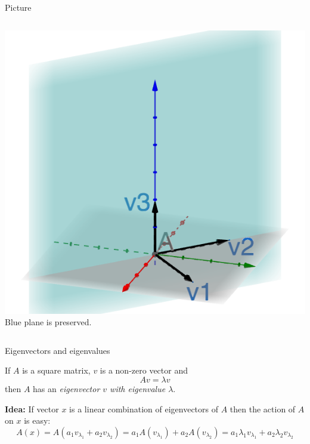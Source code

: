 \documentclass{beamer}
\begin{document}
\begin{frame}{Picture}
\begin{columns}
	\includegraphics[scale=0.4]{3d-rotation.png}
	Blue plane is preserved.
\end{columns}
\end{frame}

\begin{frame}{Eigenvectors and eigenvalues}
\begin{definition}
If $A$ is a square matrix, $v$ is a non-zero vector and
\begin{equation*}
	Av = \lambda v
\end{equation*}
then $A$ has an \emph{eigenvector $v$ with eigenvalue $\lambda$}.
\end{definition}\vfill
{\bf Idea:} If vector $x$ is a linear combination of eigenvectors of $A$ then the action of $A$ on $x$ is easy:
\begin{equation*}
	A(x) = A\left(a_1v_{\lambda_1}+a_2v_{\lambda_2}\right) = a_1A(v_{\lambda_1})+a_2A(v_{\lambda_2}) = a_1\lambda_1v_{\lambda_1}+a_2\lambda_2v_{\lambda_2}
\end{equation*}
\end{frame}
\end{document}
